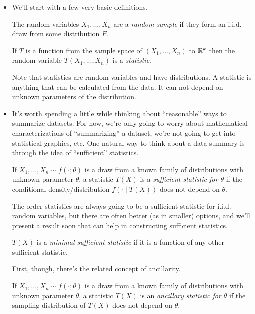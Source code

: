 \begin{itemize}[leftmargin=0pt]

\item We'll start with a few very basic definitions.
  \begin{defn}
    The random variables $X_1,...,X_n$ are a \emph{random sample} if
    they form an i.i.d. draw from some distribution $F$.
  \end{defn}

  \begin{defn}
    If $T$ is a function from the sample space of $(X_1,...,X_n)$ to
    $\mathbb{R}^k$ then the random variable $T(X_1,...,X_n)$ is a
    \emph{statistic}.
  \end{defn}

  Note that statistics are random variables and have distributions.  A
  statistic is anything that can be calculated from the data.  It can
  not depend on unknown parameters of the distribution.

\item It's worth spending a little while thinking about ``reasonable''
  ways to summarize datasets.  For now, we're only going to worry
  about mathematical characterizations of ``summarizing'' a dataset,
  we're not going to get into statistical graphics, etc.  One natural
  way to think about a data summary is through the idea of
  ``sufficient'' statistics.

  \begin{defn}
    If $X_1,...,X_n \sim f(\cdot; \theta)$ is a draw from a known family of
    distributions with unknown parameter $\theta$, a statistic $T(X)$ is a
    \emph{sufficient statistic for $\theta$} if the conditional
    density/distribution $f(\cdot \mid T(X))$ does not depend on $\theta$.
  \end{defn}

  The order statistics are always going to be a sufficient statistic
  for i.i.d. random variables, but there are often better (as in
  smaller) options, and we'll present a result soon that can help in
  constructing sufficient statistics.

  \begin{defn}
    $T(X)$ is a \emph{minimal sufficient statistic} if it is a
    function of any other sufficient statistic.
  \end{defn}

  First, though, there's the related concept of ancillarity.

  \begin{defn}
    If $X_1,...,X_n \sim f(\cdot; \theta)$ is a draw from a known family of
    distributions with unknown parameter $\theta$, a statistic $T(X)$ is an
    \emph{ancillary statistic for $\theta$} if the sampling distribution of
    $T(X)$ does not depend on $\theta$.
  \end{defn}


\end{itemize}
